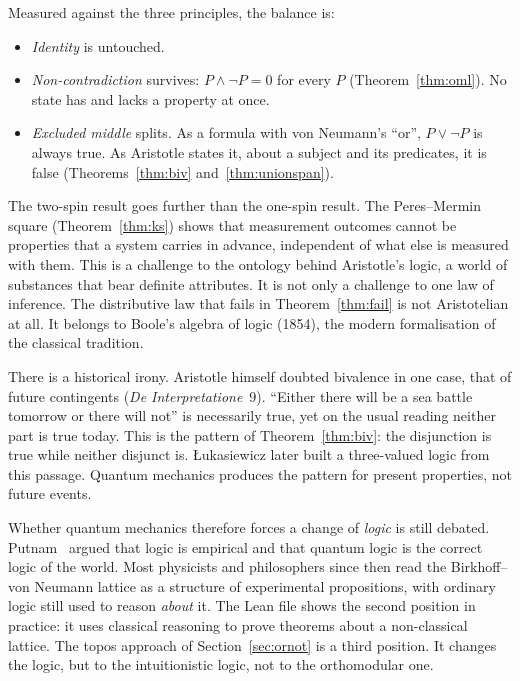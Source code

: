\documentclass[11pt,a4paper]{article}
\theoremstyle{plain}
\theoremstyle{definition}
\theoremstyle{remark}
\begin{document}
Measured against the three principles, the balance is:
\begin{itemize}
\item \emph{Identity} is untouched.
\item \emph{Non-contradiction} survives: $P\wedge\neg P=0$ for every $P$ (Theorem~\ref{thm:oml}). No state has and lacks a property at once.
\item \emph{Excluded middle} splits. As a formula with von Neumann's ``or'', $P\vee\neg P$ is always true. As Aristotle states it, about a subject and its predicates, it is false (Theorems~\ref{thm:biv} and~\ref{thm:unionspan}).
\end{itemize}
The two-spin result goes further than the one-spin result. The Peres--Mermin square (Theorem~\ref{thm:ks}) shows that measurement outcomes cannot be properties that a system carries in advance, independent of what else is measured with them. This is a challenge to the ontology behind Aristotle's logic, a world of substances that bear definite attributes. It is not only a challenge to one law of inference. The distributive law that fails in Theorem~\ref{thm:fail} is not Aristotelian at all. It belongs to Boole's algebra of logic (1854), the modern formalisation of the classical tradition.

There is a historical irony. Aristotle himself doubted bivalence in one case, that of future contingents (\emph{De Interpretatione}~9). ``Either there will be a sea battle tomorrow or there will not'' is necessarily true, yet on the usual reading neither part is true today. This is the pattern of Theorem~\ref{thm:biv}: the disjunction is true while neither disjunct is. \L{}ukasiewicz later built a three-valued logic from this passage. Quantum mechanics produces the pattern for present properties, not future events.

Whether quantum mechanics therefore forces a change of \emph{logic} is still debated. Putnam~\cite{Putnam} argued that logic is empirical and that quantum logic is the correct logic of the world. Most physicists and philosophers since then read the Birkhoff--von Neumann lattice as a structure of experimental propositions, with ordinary logic still used to reason \emph{about} it. The Lean file shows the second position in practice: it uses classical reasoning to prove theorems about a non-classical lattice. The topos approach of Section~\ref{sec:ornot} is a third position. It changes the logic, but to the intuitionistic logic, not to the orthomodular one.

\appendix
\end{document}
